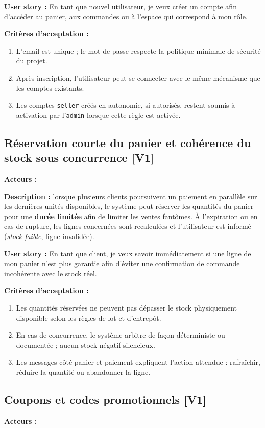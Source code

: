 \documentclass[11pt,a4paper]{scrreprt}
\newcommand{\code}[1]{\texttt{#1}}
\newcommand{\phase}[1]{\textbf{\textcolor{SplinAmber}{#1}}}
\newcommand{\actorbadge}[1]{\highlight{\code{#1}}}
\begin{document}
\textbf{User story :} En tant que nouvel utilisateur, je veux créer un compte afin d'accéder au panier, aux commandes ou à l'espace qui correspond à mon rôle.

\textbf{Critères d'acceptation :}
\begin{enumerate}
  \item L'email est unique ; le mot de passe respecte la politique minimale de sécurité du projet.
  \item Après inscription, l'utilisateur peut se connecter avec le même mécanisme que les comptes existants.
  \item Les comptes \code{seller} créés en autonomie, si autorisés, restent soumis à activation par l'\code{admin} lorsque cette règle est activée.
\end{enumerate}

\subsection{Réservation courte du panier et cohérence du stock sous concurrence \phase{[V1]}}
\textbf{Acteurs :} \actorbadge{CUSTOMER} \actorbadge{SYSTEM}

\textbf{Description :} lorsque plusieurs clients poursuivent un paiement en parallèle sur les dernières unités disponibles, le système peut réserver les quantités du panier pour une \textbf{durée limitée} afin de limiter les ventes fantômes. À l'expiration ou en cas de rupture, les lignes concernées sont recalculées et l'utilisateur est informé (\emph{stock faible}, ligne invalidée).

\textbf{User story :} En tant que client, je veux savoir immédiatement si une ligne de mon panier n'est plus garantie afin d'éviter une confirmation de commande incohérente avec le stock réel.

\textbf{Critères d'acceptation :}
\begin{enumerate}
  \item Les quantités réservées ne peuvent pas dépasser le stock physiquement disponible selon les règles de lot et d'entrepôt.
  \item En cas de concurrence, le système arbitre de façon déterministe ou documentée ; aucun stock négatif silencieux.
  \item Les messages côté panier et paiement expliquent l'action attendue : rafraîchir, réduire la quantité ou abandonner la ligne.
\end{enumerate}

\subsection{Coupons et codes promotionnels \phase{[V1]}}
\textbf{Acteurs :} \actorbadge{ADMIN} \actorbadge{CUSTOMER}
\end{document}
